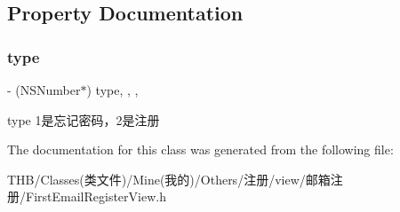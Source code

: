 \subsection{Property Documentation}
\mbox{\label{interface_first_email_register_view_aeb93d08a05d4461d6ae1df019ff48d4c}} 
\subsubsection{\texorpdfstring{type}{type}}
{\footnotesize\ttfamily -\/ (N\+S\+Number$\ast$) type\hspace{0.3cm}{\ttfamily [read]}, {\ttfamily [write]}, {\ttfamily [nonatomic]}, {\ttfamily [assign]}}

type 1是忘记密码，2是注册 

The documentation for this class was generated from the following file\+:\begin{DoxyCompactItemize}
\item 
T\+H\+B/\+Classes(类文件)/\+Mine(我的)/\+Others/注册/view/邮箱注册/First\+Email\+Register\+View.\+h\end{DoxyCompactItemize}
